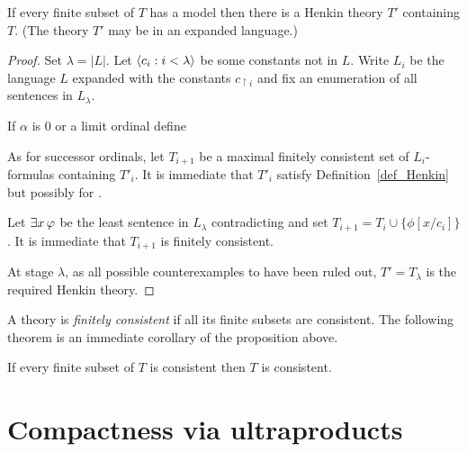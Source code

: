 \documentclass[creche.tex]{subfiles}
\begin{document}
\begin{proposition}If every finite subset of $T$ has a model then there is a Henkin theory $T'$ containing $T$. (The theory $T'$ may be in an expanded language.)
\end{proposition}

\begin{proof} Set $\lambda=|L|$. Let $\langle c_i:i<\lambda\rangle$ be some constants not in $L$. Write $L_i$ be the language $L$ expanded with the constants $c_{\restriction i}$ and fix an enumeration of all sentences in $L_\lambda$. 

If $\alpha$ is $0$ or a limit ordinal define 


As for successor ordinals, let $T_{i+1}$ be a maximal finitely consistent set of $L_i$-formulas containing $T'_i$. It is immediate that $T'_i$ satisfy Definition~\ref{def_Henkin} but possibly for .

Let $\exists x\, \varphi$ be the least sentence in $L_\lambda$ contradicting  and set $T_{i+1}=T_i\cup\big\{\phi[x/c_i]\big\}$. It is immediate that $T_{i+1}$ is finitely consistent. 

At stage $\lambda$, as all possible counterexamples to  have been ruled out, $T'=T_\lambda$ is the required Henkin theory.
\end{proof}

A theory is \emph{finitely consistent\/} if all its finite subsets are consistent. The following theorem is an immediate corollary of the proposition above.

\begin{void_thm}
If every finite subset of $T$ is consistent then $T$ is consistent.\QED
\end{void_thm}



\section{Compactness via ultraproducts}\label{compactness}
\def\medrel#1{\parbox[t]{6ex}{$\displaystyle\hfil #1$}}
\def\ceq#1#2#3{\parbox{25ex}{$\displaystyle #1$}\medrel{#2}$\displaystyle  #3$}
\end{document}
